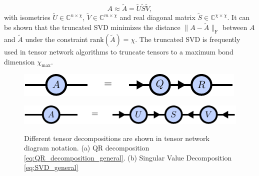 \begin{equation}
	\label{eq:truncated_SVD_general}
	A \approx \tilde{A} = \tilde{U}\tilde{S}\tilde{V},
\end{equation}
with isometries $\tilde{U}\in\mathbb{C}^{n\times\chi}$, $\tilde{V}\in\mathbb{C}^{m\times\chi}$ and real diagonal matrix $\tilde{S}\in\mathbb{C}^{\chi\times\chi}$. It can be shown \cite{cite:eckart_young_theorem} that the truncated SVD minimizes the distance $\lVert A - \tilde{A} \rVert_\text{F}$ between $A$ and $\tilde{A}$ under the constraint $\text{rank}(\tilde{A}) = \chi$. The truncated SVD is frequently used in tensor network algorithms to truncate tensors to a maximum bond dimension $\chi_\text{max}$. \par
\begin{figure}
	\centering
	\begin{subfigure}[c]{0.1\textwidth}
		\caption{}\label{fig:tensor_decomposition_qr}
	\end{subfigure}%
	\begin{minipage}[c]{0.6\textwidth}
		\raisebox{-26pt}
		{%
			\includegraphics[scale=1]{figures/tikz/Tensor_Networks/tensor_decompositions/tensor_decompositions_a.pdf}
		}
	\end{minipage}
	\begin{subfigure}[c]{0.1\textwidth}
		\caption{}\label{fig:tensor_decomposition_qr}
	\end{subfigure}%
	\begin{minipage}[c]{0.6\textwidth}
		\raisebox{-26pt}
		{%
			\includegraphics[scale=1]{figures/tikz/Tensor_Networks/tensor_decompositions/tensor_decompositions_b.pdf}
		}
	\end{minipage}
	\caption{Different tensor decompositions are shown in tensor network diagram notation. (a) QR decomposition \eqref{eq:QR_decomposition_general}. (b) Singular Value Decomposition \eqref{eq:SVD_general}}
	\label{fig:tensor_decomposition_diagrams}
\end{figure}
